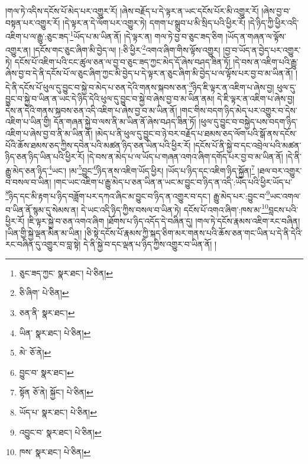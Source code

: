 །གལ་ཏེ་འདིས་དངོས་པོ་མེད་པར་འགྱུར་རོ། །ཞེས་བརྗོད་པ་དེ་ལྟར་ན་ཡང་དངོས་པོར་མི་འགྱུར་རོ། །ཞེས་བྱ་བ་བསྟན་པར་འགྱུར་རོ། །དེ་ལྟར་ན་དེ་ལོག་པར་འགྱུར་ཏེ། དགག་པ་སྒྲུབ་པ་མི་སྲིད་པའི་ཕྱིར་རོ། །དེ་ཉིད་ཀྱི་ཕྱིར་འདི་འཇིག་པ་ལ་རྒྱུ་:ཅུང་ཟད་\footnote{ཅུང་ཟད་ཀྱང་  སྣར་ཐང་།  པེ་ཅིན། }ཡོད་པ་མ་ཡིན་ནོ། །དེ་ལྟར་ན། གལ་ཏེ་བྱ་བ་ཅུང་ཟད་ཅིག །ཡོད་ན་གཞན་ལ་ལྟོས་འགྱུར་ན། །དངོས་གང་ཅུང་ཞིག་མི་བྱེད་ལ། །:ཅི་ཕྱིར་\footnote{ཅི་ཞིག་  པེ་ཅིན། }འགའ་ཞིག་གིས་ལྟོས་འགྱུར། །བྱ་བ་ཡོད་ན་བྱེད་པར་འགྱུར་ཏེ། དངོས་པོ་འཇིག་པའི་ངང་ཚུལ་ཅན་ལ་བྱ་བ་ཅུང་ཟད་ཀྱང་མེད་དོ་ཞེས་བཤད་ཟིན་ཏོ། །དེ་བས་ན་འཇིག་པའི་རྒྱུ་ཞེས་བྱ་བ་དེ་ནི་དངོས་པོ་ལ་ཅུང་ཞིག་ཀྱང་མི་བྱེད་པ་དེ་ལྟར་ན་ཅུང་ཞིག་མི་བྱེད་པ་ལ་ལྟོས་པར་བྱ་བ་མ་ཡིན་ནོ། །དེ་ནི་དངོས་པོ་ཕུལ་དུ་བྱུང་བ་སྐྱེ་བ་མེད་པ་ཅན་དེའི་གནས་སྐབས་ཅན་\footnote{ཅན་ནི་  སྣར་ཐང་། }ཉིད་ཇི་ལྟར་ན་འཇིག་པ་ཞེས་བྱ། ཕུལ་དུ་བྱུང་བ་སྐྱེ་བ་ཡིན་ན་ཡང་དེ་ཉིད་དེའི་ཕུལ་དུ་བྱུང་བ་སྐྱེ་བ་ཞེས་བྱ་བ་མ་ཡིན་ནམ། དེ་ཇི་ལྟར་ན་འཇིག་པ་ཞེས་བྱ། དེས་ན་དེའི་གནས་སྐབས་ཅན་འདི་འཇིག་པ་ཞེས་བྱ་བ་མ་ཡིན་ནོ། །གང་གིས་བདག་ཉིད་མེད་པར་འགྱུར་བ་དེས་འཇིག་པ་ཡིན་གྱི། དོན་གཞན་སྐྱེ་བ་ལས་ནི་མ་ཡིན་ནོ་ཞེས་བཤད་ཟིན་ཏོ། །ཕུལ་དུ་བྱུང་བ་བསྐྱེད་པས་བདག་ཉིད་འཇིག་པ་ཞེས་བྱ་བ་ནི་མ་ཡིན་ནོ། །མེད་པ་ནི་ཕུལ་དུ་བྱུང་བ་ཉེ་བར་བརྗོད་པ་ཐམས་ཅད་ལོག་པའི་སྒོ་ནས་དངོས་པོའི་ཆོས་ཐམས་ཅད་ཀྱིས་དབེན་པའི་མཚན་ཉིད་ཅན་ཡིན་པའི་ཕྱིར་རོ། །དངོས་པོ་ནི་སྐྱེ་བ་དང་འབྲེལ་པའི་མཚན་ཉིད་ཅན་ཉིད་ཡིན་པའི་ཕྱིར་རོ། །དེ་བས་ན་མེད་པ་ལ་ཡོད་པ་གཞན་འགའ་ཞིག་དགོད་པར་བྱ་བ་མ་ཡིན་ནོ། །དེ་ནི་རྒྱུ་མེད་ཅན་ཉིད་\footnote{ཡིན་  སྣར་ཐང་།  པེ་ཅིན། }ཡང་། །མ་\footnote{མེ་  ཅོ་ནེ། }བྱུང་\footnote{བྱུང་བ་  སྣར་ཐང་། }ཉིད་ནས་འཇིག་ཡོད་ཕྱིར། །ཡོད་པ་ཉིད་དང་འཇིག་ཉིད་སྐྱོན།\footnote{སྟོན  ཅོ་ནེ། སྐྱོང་།  པེ་ཅིན། } །ཐལ་བར་འགྱུར་བ་བསལ་བ་ཡིན། །གང་ཡང་འཇིག་པ་རྒྱུ་མེད་པ་ཅན་ཡིན་ན་ཡང་མ་བྱུང་བ་ཉིད་ན་འདི་:ཡོད་པའི་ཕྱིར་ཡོད་པ་\footnote{ཡོད་པ་  སྣར་ཐང་།  པེ་ཅིན། }ཉིད་དང་མི་རྟག་པ་ཉིད་བཟློག་པར་དཀའ་ཞིང་མ་བྱུང་བ་ཉིད་ན་འགྱུར་བ་དང་། རྒྱུ་མེད་པར་:བྱུང་བ་\footnote{འབྱུང་བ་  སྣར་ཐང་།  པེ་ཅིན། }ཡང་འགལ་བ་ཡིན་ནོ་སྙམ་དུ་སེམས་ན། དེ་ཡང་འདི་ཉིད་ཀྱིས་བསལ་བ་ཡིན་ཏེ། དངོས་པོ་འགའ་ཞིག་:ཁས་མ་\footnote{ཁས་  སྣར་ཐང་།  པེ་ཅིན། }བླངས་པའི་ཕྱིར་རོ། །ཇི་ལྟར་སྐྱེ་བ་ཅན་འགའ་ཞིག །ཐོགས་པ་ཉིད་འདོད་དེ་བཞིན་དུ། །གལ་ཏེ་དངོས་རྣམས་འཇིག་རང་བཞིན། །ཡིན་གྱི་སྐྱེ་ལྡན་མིན་མ་ཡིན། །ཅི་སྟེ་དངོས་པོ་རྣམས་ཀྱི་སྐད་ཅིག་མར་གནས་པའི་ཆོས་ཅན་གང་ཡིན་པ་དེ་ནི་དེའི་རང་བཞིན་དུ་འགྱུར་བ་བླ་སྟེ། དེ་ནི་སྐྱེ་བ་དང་ལྡན་པ་ཉིད་ཀྱིས་འགྱུར་བ་ཡིན་ནོ། །
